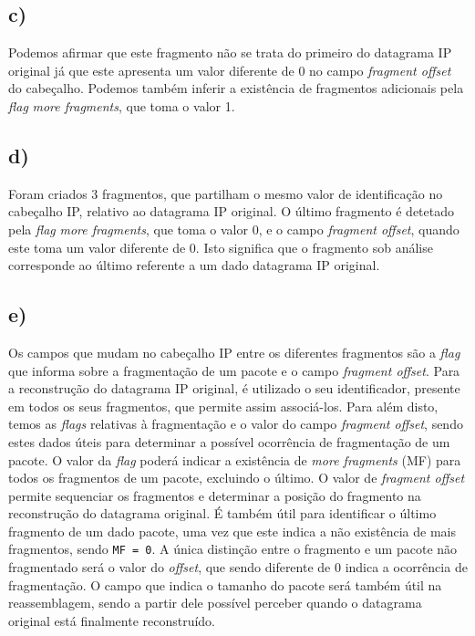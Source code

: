 \documentclass{llncs}
\begin{document}
\subsection*{c)}

Podemos afirmar que este fragmento não se trata do primeiro do datagrama IP original já que este apresenta um valor diferente de 0 no campo \textit{fragment offset} do cabeçalho. Podemos também inferir a existência de fragmentos adicionais pela \textit{flag} \textit{more fragments}, que toma o valor 1.

\subsection*{d)}

Foram criados 3 fragmentos, que partilham o mesmo valor de identificação no cabeçalho IP, relativo ao datagrama IP original. O último fragmento é detetado pela \textit{flag} \textit{more fragments}, que toma o valor 0, e o campo \textit{fragment offset}, quando este toma um valor diferente de 0. Isto significa que o fragmento sob análise corresponde ao último referente a um dado datagrama IP original.

\subsection*{e)}

Os campos que mudam no cabeçalho IP entre os diferentes fragmentos são a \textit{flag} que informa sobre a fragmentação de um pacote e o campo \textit{fragment offset}. Para a reconstrução do datagrama IP original, é utilizado o seu identificador, presente em todos os seus fragmentos, que permite assim associá-los. Para além disto, temos as \textit{flags} relativas à fragmentação e o valor do campo \textit{fragment offset}, sendo estes dados úteis para determinar a possível ocorrência de fragmentação de um pacote. O valor da \textit{flag} poderá indicar a existência de \textit{more fragments} (MF) para todos os fragmentos de um pacote, excluindo o último. O valor de \textit{fragment offset} permite sequenciar os fragmentos e determinar a posição do fragmento na reconstrução do datagrama original. É também útil para identificar o último fragmento de um dado pacote, uma vez que este indica a não existência de mais fragmentos, sendo \texttt{MF = 0}. A única distinção entre o fragmento e um pacote não fragmentado será o valor do \textit{offset}, que sendo diferente de 0 indica a ocorrência de fragmentação. O campo que indica o tamanho do pacote será também útil na reassemblagem, sendo a partir dele possível perceber quando o datagrama original está finalmente reconstruído.
\end{document}
